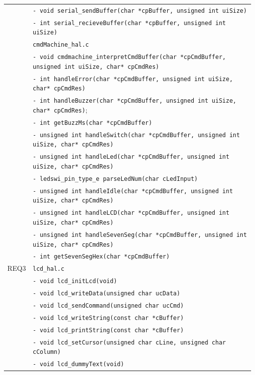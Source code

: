 \documentclass{article}
\begin{document}
\begin{table}[H]
{\begin{tabular}{|c|l|}
						& \texttt{- void serial\_sendBuffer(char *cpBuffer, unsigned int uiSize)}\\
						& \texttt{- int serial\_recieveBuffer(char *cpBuffer, unsigned int uiSize)}\\
						& \texttt{cmdMachine\_hal.c}\\
						& \texttt{- void cmdmachine\_interpretCmdBuffer(char *cpCmdBuffer, unsigned int uiSize, char* cpCmdRes)}\\
						& \texttt{- int handleError(char *cpCmdBuffer, unsigned int uiSize, char* cpCmdRes)}\\
						& \texttt{- int handleBuzzer(char *cpCmdBuffer, unsigned int uiSize, char* cpCmdRes)};\\
						& \texttt{- int getBuzzMs(char *cpCmdBuffer)}\\
						& \texttt{- unsigned int handleSwitch(char *cpCmdBuffer, unsigned int uiSize, char* cpCmdRes)}\\
						& \texttt{- unsigned int handleLed(char *cpCmdBuffer, unsigned int uiSize, char* cpCmdRes)}\\
						& \texttt{- ledswi\_pin\_type\_e parseLedNum(char cLedInput)}\\
						& \texttt{- unsigned int handleIdle(char *cpCmdBuffer, unsigned int uiSize, char* cpCmdRes)}\\
						& \texttt{- unsigned int handleLCD(char *cpCmdBuffer, unsigned int uiSize, char* cpCmdRes)}\\
						& \texttt{- unsigned int handleSevenSeg(char *cpCmdBuffer, unsigned int uiSize, char* cpCmdRes)}\\
						& \texttt{- int getSevenSegHex(char *cpCmdBuffer)}\\
		\hline REQ3 	& \texttt{lcd\_hal.c}\\ 
						& \texttt{- void lcd\_initLcd(void)}\\
						& \texttt{- void lcd\_writeData(unsigned char ucData)}\\
						& \texttt{- void lcd\_sendCommand(unsigned char ucCmd)}\\
						& \texttt{- void lcd\_writeString(const char *cBuffer)}\\
						& \texttt{- void lcd\_printString(const char *cBuffer)}\\
						& \texttt{- void lcd\_setCursor(unsigned char cLine, unsigned char cColumn)}\\
						& \texttt{- void lcd\_dummyText(void)}\\
		\hline 
	\end{tabular}
	} 
	\normalsize
\end{table}
\end{document}
